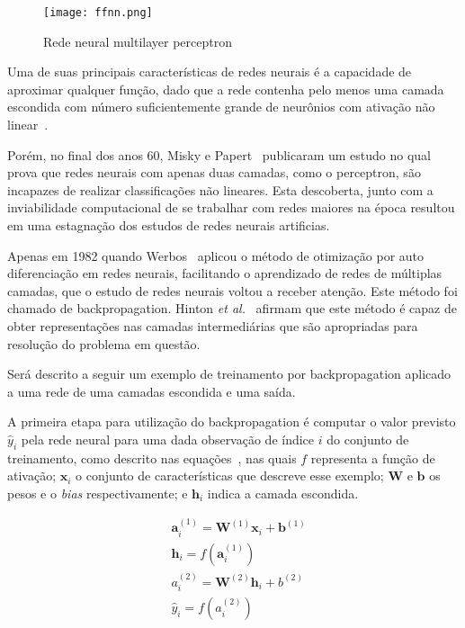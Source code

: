 \begin{figure}
\begin{center} {
    \begin{center}
    \texttt{[image: ffnn.png]}
    \caption{Rede neural multilayer perceptron}
    \label{fig:ff-neural-net}
    \end{center}
}
\end{center}
\end{figure}

Uma de suas principais características de redes neurais é a capacidade de aproximar qualquer função, dado que a rede
contenha pelo menos uma camada escondida com número suficientemente grande de neurônios com ativação não
linear~\cite{hornik89}.

Porém, no final dos anos 60, Misky e Papert~\cite{minsky72} publicaram um estudo no qual prova que redes neurais com
apenas duas camadas, como o perceptron, são incapazes de realizar classificações não lineares.
Esta descoberta, junto com a inviabilidade computacional de se trabalhar com redes maiores na época resultou em uma
estagnação dos estudos de redes neurais artificias.

Apenas em 1982 quando Werbos~\cite{werbos82} aplicou o método de otimização por auto diferenciação em redes neurais,
facilitando o aprendizado de redes de múltiplas camadas, que o estudo de redes neurais voltou a receber atenção.
Este método foi chamado de backpropagation.
Hinton \textit{et al.}~\cite{williams86} afirmam que este método é capaz de obter representações nas camadas
intermediárias que são apropriadas para resolução do problema em questão.

Será descrito a seguir um exemplo de treinamento por backpropagation aplicado a uma rede de uma camadas escondida e uma
saída.

A primeira etapa para utilização do backpropagation é computar o valor previsto ${\hat{y}_i}$ pela rede neural para
uma dada observação de índice $i$ do conjunto de treinamento, como descrito nas
equações~, nas quais $f$ representa a função de ativação; $\mathbf{x}_i$ o
conjunto de características que descreve esse exemplo; $\mathbf{W}$ e $\mathbf{b}$ os pesos e o \textit{bias}
respectivamente; e $\mathbf{h}_i$ indica a camada escondida.

\begin{subequations} \label{eq:nn-forward}
\begin{align}
    &\mathbf{a}_i^{(1)} = \mathbf{W}^{(1)} \mathbf{x}_i + \mathbf{b}^{(1)} \label{eq:nn-forward-a1}\\
    &\mathbf{h}_i = f(\mathbf{a}_i^{(1)}) \label{eq:nn-forward-hidden}\\
    &a_i^{(2)} = \mathbf{W}^{(2)} \mathbf{h}_i + b^{(2)} \label{eq:nn-forward-a2}\\
    &\hat{y}_i = f(a_i^{(2)}) \label{eq:nn-forward-y}
\end{align}
\end{subequations}

